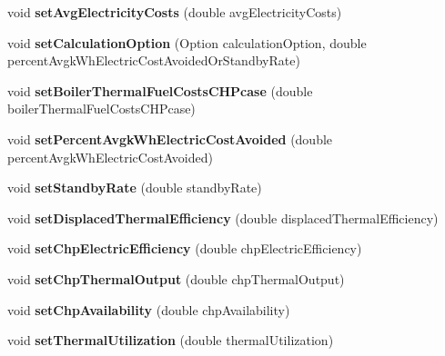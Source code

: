 \begin{DoxyCompactItemize}
\item 
\mbox{\label{class_c_h_p_ad953f7558bf3a38816e29d9ffaf6273c}} 
void {\bfseries set\+Avg\+Electricity\+Costs} (double avg\+Electricity\+Costs)
\item 
\mbox{\label{class_c_h_p_abfa71c23fa4b58c03c3337b57ba0d56d}} 
void {\bfseries set\+Calculation\+Option} (Option calculation\+Option, double percent\+Avgk\+Wh\+Electric\+Cost\+Avoided\+Or\+Standby\+Rate)
\item 
\mbox{\label{class_c_h_p_a319f1e915035b2dface2dbad67c65017}} 
void {\bfseries set\+Boiler\+Thermal\+Fuel\+Costs\+C\+H\+Pcase} (double boiler\+Thermal\+Fuel\+Costs\+C\+H\+Pcase)
\item 
\mbox{\label{class_c_h_p_a002b9e405c3a1777b306430cd1bbbec3}} 
void {\bfseries set\+Percent\+Avgk\+Wh\+Electric\+Cost\+Avoided} (double percent\+Avgk\+Wh\+Electric\+Cost\+Avoided)
\item 
\mbox{\label{class_c_h_p_ac25d489d5d3e336f7286c0124f81d3c5}} 
void {\bfseries set\+Standby\+Rate} (double standby\+Rate)
\item 
\mbox{\label{class_c_h_p_a6f80ede27800dfdeb0493e0501823fde}} 
void {\bfseries set\+Displaced\+Thermal\+Efficiency} (double displaced\+Thermal\+Efficiency)
\item 
\mbox{\label{class_c_h_p_a63de982e8324e669ea8a6712a30a6ce4}} 
void {\bfseries set\+Chp\+Electric\+Efficiency} (double chp\+Electric\+Efficiency)
\item 
\mbox{\label{class_c_h_p_a4b132e4e600df80fa87c0e7b680733b7}} 
void {\bfseries set\+Chp\+Thermal\+Output} (double chp\+Thermal\+Output)
\item 
\mbox{\label{class_c_h_p_a0dc3c1f0e0b67564a56b5863c1abf974}} 
void {\bfseries set\+Chp\+Availability} (double chp\+Availability)
\item 
\mbox{\label{class_c_h_p_a8917dfa8b8a68244d0ffe3fd3ca1d13f}} 
void {\bfseries set\+Thermal\+Utilization} (double thermal\+Utilization)
\item 

\end{DoxyCompactItemize}
